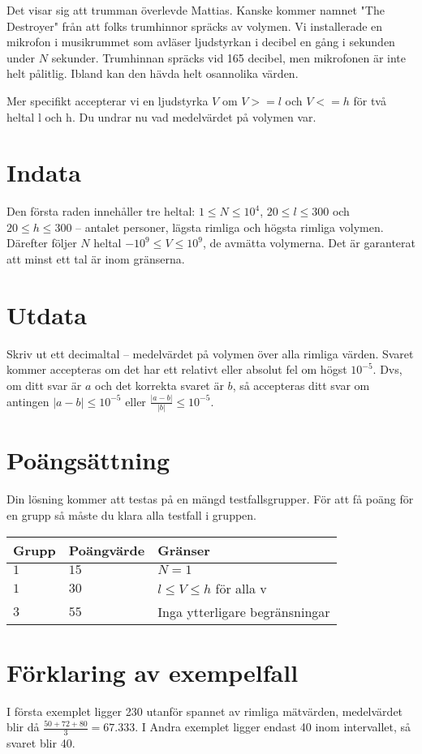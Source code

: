 Det visar sig att trumman överlevde Mattias. Kanske kommer namnet "The Destroyer" från att folks trumhinnor spräcks av volymen.
Vi installerade en mikrofon i musikrummet som avläser ljudstyrkan i decibel en gång i sekunden under $N$ sekunder. 
Trumhinnan spräcks vid 165 decibel, men mikrofonen är inte helt pålitlig. Ibland kan den hävda helt osannolika värden.

Mer specifikt accepterar vi en ljudstyrka $V$ om $V>=l$ och $V<=h$ för två heltal l och h. Du undrar nu vad medelvärdet på volymen var.


\section*{Indata}
Den första raden innehåller tre heltal: $1\leq N \leq 10^4$, $20 \leq l \leq 300$ och $20 \leq h \leq 300$  -- antalet personer, lägsta rimliga och högsta rimliga volymen. 
Därefter följer $N$ heltal $-10^9 \leq V \leq 10^9$, de avmätta volymerna.
Det är garanterat att minst ett tal är inom gränserna.

\section*{Utdata}
Skriv ut ett decimaltal -- medelvärdet på volymen över alla rimliga värden.
Svaret kommer accepteras om det har ett relativt eller absolut fel om högst $10^{-5}$.
Dvs, om ditt svar är $a$ och det korrekta svaret är $b$, så accepteras ditt svar om
antingen $|a-b| \le 10^{-5}$ eller $\frac{|a-b|}{|b|} \le 10^{-5}$.

\section*{Poängsättning}
Din lösning kommer att testas på en mängd testfallsgrupper.
För att få poäng för en grupp så måste du klara alla testfall i gruppen.

\noindent
\begin{tabular}{| l | l | p{12cm} |}
  \hline
  Grupp & Poängvärde & Gränser \\ \hline
  $1$   & $15$       & $N=1$ \\ \hline
  $1$   & $30$       & $l \leq V \leq h$ för alla v \\ \hline
  $3$   & $55$       & Inga ytterligare begränsningar \\ \hline
\end{tabular}

\section*{Förklaring av exempelfall}
I första exemplet ligger 230 utanför spannet av rimliga mätvärden, medelvärdet blir då $\frac{50+72+80}{3} = 67.333$.
I Andra exemplet ligger endast 40 inom intervallet, så svaret blir 40.